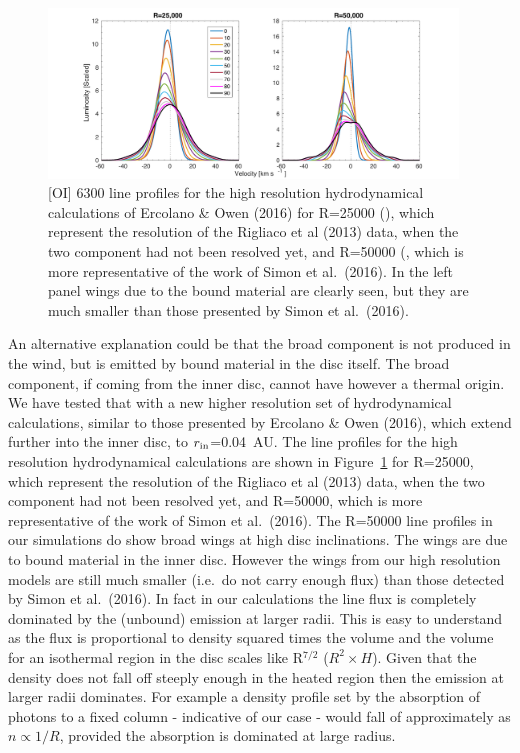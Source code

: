 \documentclass[10pt,fleqn,twoside]{article}
\begin{document}
 \begin{figure}
   \centering
   \includegraphics[width=0.97\textwidth]{lines_both.pdf}
  
   \caption{[OI] 6300 line
profiles for the high resolution hydrodynamical calculations of
Ercolano \& Owen (2016) for R=25000 (), 
which represent the resolution of the
Rigliaco et al (2013) data, when the two component had not been
resolved yet, and R=50000 (, which is more representative
of the work of Simon et al.\ (2016). In the left panel wings due to the
bound material are clearly seen, but they are much smaller than those
presented by Simon et al.\ (2016).
}
              \label{fig:wings}
    \end{figure}


An alternative explanation could be that the broad
component is not produced in the wind, but is emitted by bound
material in the disc itself. The broad component, if coming from the
inner disc, cannot have however a thermal origin. We have tested that
with a new higher resolution set of hydrodynamical calculations,
similar to those presented by Ercolano \& Owen (2016), which
extend further into the inner disc, to $r_{\rm in}$=0.04~AU. The line
profiles for the high resolution hydrodynamical calculations are shown
in Figure~\ref{fig:wings} for R=25000, which represent the resolution of the
Rigliaco et al (2013) data, when the two component had not been
resolved yet, and R=50000, which is more representative
of the work of Simon et al.\ (2016). The
R=50000 line profiles in our simulations do show broad wings at high disc
inclinations. The wings are due to bound material in the inner
disc. However the wings from our high resolution models are still much
smaller (i.e.\ do not carry enough flux) than those detected by
Simon et al.\ (2016). In fact in our calculations the line flux
is completely dominated by the (unbound) emission at larger
radii. This is easy to understand as the flux is proportional to
density squared times the volume and the volume for an isothermal
region in the disc scales like R$^{7/2}$ ($R^2\times H$). Given that
the density does not fall off steeply enough in the heated region then
the emission at larger radii dominates. For 
example a density profile set by the absorption of photons to a fixed
column - indicative of our case - would fall of approximately as
$n\propto1/R$, provided the absorption is dominated at large radius.
\end{document}
